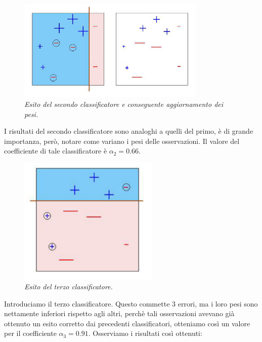 \begin{figure}[!h]
\centering
\includegraphics[width=0.8\textwidth]{esempio_adaboost3.png}%
 \caption{\textit{Esito del secondo classificatore e conseguente aggiornamento dei pesi.}}
 \label{grafico3}
\end{figure}

I risultati del secondo classificatore sono analoghi a quelli del primo, \`e di grande importanza, per\`o, notare come variano i pesi delle osservazioni.
Il valore del coefficiente di tale classificatore \`e \begin{math}\alpha_2=0.66\end{math}.
\begin{figure}[!h]
\centering
\includegraphics[width=0.6\textwidth]{esempio_adaboost4.png}%
 \caption{\textit{Esito del terzo classificatore.}}
 \label{grafico4}
\end{figure}
\newpage
Introduciamo il terzo classificatore. Questo commette 3 errori, ma i loro pesi sono nettamente inferiori rispetto agli altri,
perch\`e tali osservazioni avevano gi\`a ottenuto un esito corretto dai precedenti classificatori, otteniamo cos\`i un valore per
il coefficiente \begin{math}\alpha_3=0.91\end{math}. Osserviamo i risultati cos\`i ottenuti:


